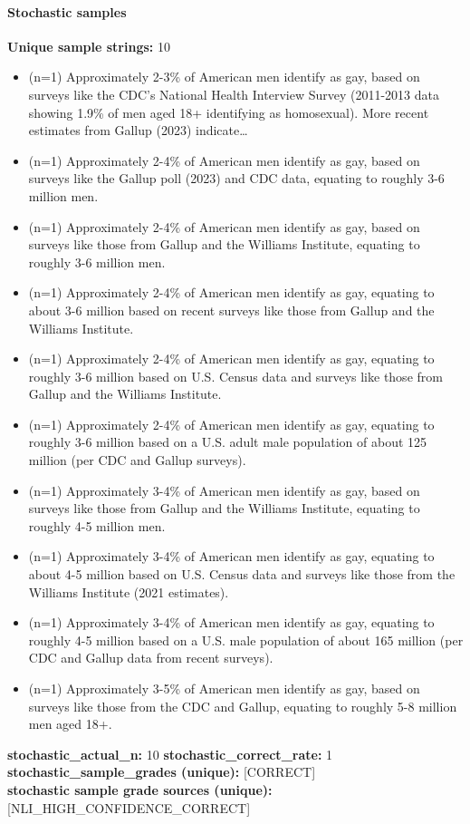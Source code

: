 \documentclass[11pt]{article}
\begin{document}
\paragraph{Stochastic samples}
\textbf{Unique sample strings:} 10\\
\small
\begin{itemize}
\item (n=1) Approximately 2-3\% of American men identify as gay, based on surveys like the CDC's National Health Interview Survey (2011-2013 data showing 1.9\% of men aged 18+ identifying as homosexual). More recent estimates from Gallup (2023) indicate…
\item (n=1) Approximately 2-4\% of American men identify as gay, based on surveys like the Gallup poll (2023) and CDC data, equating to roughly 3-6 million men.
\item (n=1) Approximately 2-4\% of American men identify as gay, based on surveys like those from Gallup and the Williams Institute, equating to roughly 3-6 million men.
\item (n=1) Approximately 2-4\% of American men identify as gay, equating to about 3-6 million based on recent surveys like those from Gallup and the Williams Institute.
\item (n=1) Approximately 2-4\% of American men identify as gay, equating to roughly 3-6 million based on U.S. Census data and surveys like those from Gallup and the Williams Institute.
\item (n=1) Approximately 2-4\% of American men identify as gay, equating to roughly 3-6 million based on a U.S. adult male population of about 125 million (per CDC and Gallup surveys).
\item (n=1) Approximately 3-4\% of American men identify as gay, based on surveys like those from Gallup and the Williams Institute, equating to roughly 4-5 million men.
\item (n=1) Approximately 3-4\% of American men identify as gay, equating to about 4-5 million based on U.S. Census data and surveys like those from the Williams Institute (2021 estimates).
\item (n=1) Approximately 3-4\% of American men identify as gay, equating to roughly 4-5 million based on a U.S. male population of about 165 million (per CDC and Gallup data from recent surveys).
\item (n=1) Approximately 3-5\% of American men identify as gay, based on surveys like those from the CDC and Gallup, equating to roughly 5-8 million men aged 18+.
\end{itemize}
\normalsize
\textbf{stochastic\_actual\_n:} 10 \quad \textbf{stochastic\_correct\_rate:} 1\\
\textbf{stochastic\_sample\_grades (unique):} [CORRECT]\\
\textbf{stochastic sample grade sources (unique):} [NLI\_HIGH\_CONFIDENCE\_CORRECT]\\
\end{document}
